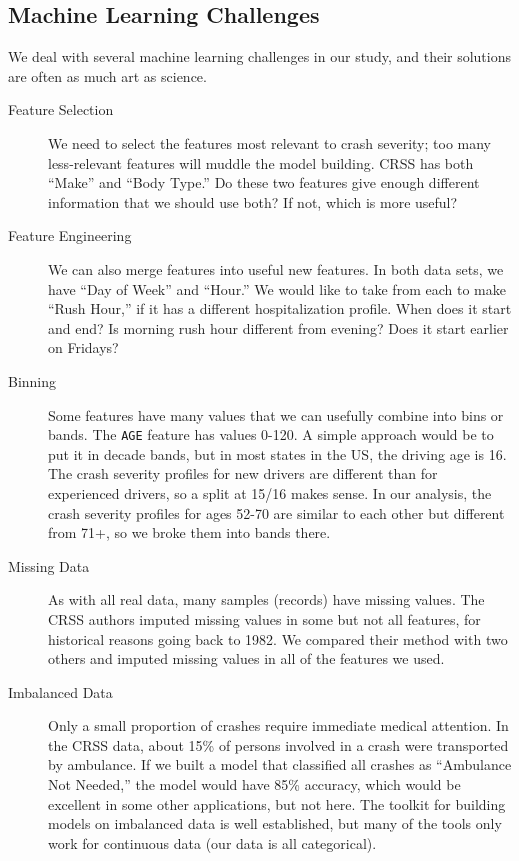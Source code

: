 \subsection{Machine Learning Challenges}

We deal with several machine learning challenges in our study, and their solutions are often as much art as science.  

\begin{description}

	\item [Feature Selection]  We need to select the features most relevant to crash severity; too many less-relevant features will muddle the model building.  CRSS has both ``Make'' and ``Body Type.''  Do these two features give enough different information 
that we should use both?  If not, which is more useful?

\item [Feature Engineering]
We can also merge features into useful new features.  In both data sets, we have ``Day of Week'' and ``Hour.''  We would like to take from each to make ``Rush Hour,'' if it has a different hospitalization profile.  When does it start and end?  Is morning rush hour different from evening?  Does it start earlier on Fridays?  

\item [Binning]
Some features have many values that we can usefully combine into bins or bands.  The \verb|AGE| feature has values 0-120.   A simple approach would be to put it in decade bands, but in most states in the US, the driving age is 16.  The crash severity profiles for new drivers are different than for experienced drivers, so a split at 15/16 makes sense.  In our analysis, the crash severity profiles for ages 52-70 are similar to each other but different from 71+, so we broke them into bands there.  
	
\item [Missing Data]  As with all real data, many samples (records) have missing values.  The CRSS authors imputed missing values in some but not all features, for historical reasons going back to 1982.  \citep{CRSS_Imputation}  We compared their method with two others and imputed missing values in all of the features we used.  

\item [Imbalanced Data]	
Only a small proportion of crashes require immediate medical attention.  In the CRSS data, about 15\% of persons involved in a crash were transported by ambulance.  If we built a model that classified all crashes as ``Ambulance Not Needed,'' the model would have 85\% accuracy, which would be excellent in some other applications, but not here.  The toolkit for building models on imbalanced data is well established, but many of the tools only work for continuous data (our data is all categorical).
	
	
\end{description}


